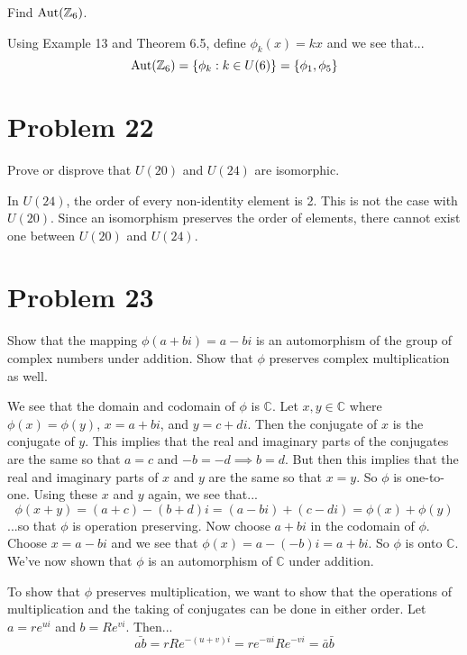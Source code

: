 \documentclass{article}
\begin{document}
Find $\mbox{Aut}(\mathbb{Z}_6)$.

Using Example 13 and Theorem 6.5, define $\phi_k(x)=kx$ and we see that...
\begin{equation*}
\mbox{Aut}(\mathbb{Z}_6) = \{\phi_k:k\in U(6)\} = \{\phi_1,\phi_5\}
\end{equation*}

\section*{Problem 22}

Prove or disprove that $U(20)$ and $U(24)$ are isomorphic.

In $U(24)$, the order of every non-identity element is 2.  This is not the
case with $U(20)$.  Since an isomorphism preserves the order of elements,
there cannot exist one between $U(20)$ and $U(24)$.

\section*{Problem 23}

Show that the mapping $\phi(a+bi)=a-bi$ is an automorphism of the group
of complex numbers under addition.  Show that $\phi$ preserves complex
multiplication as well.

We see that the domain and codomain of $\phi$ is $\mathbb{C}$.
Let $x,y\in\mathbb{C}$ where $\phi(x)=\phi(y)$, $x=a+bi$, and $y=c+di$.
Then the conjugate of $x$ is the conjugate of $y$.  This implies that
the real and imaginary parts of the conjugates are the same so that
$a=c$ and $-b=-d\implies b=d$.  But then this implies that the real and
imaginary parts of $x$ and $y$ are the same so that $x=y$.  So $\phi$ is
one-to-one.  Using these $x$ and $y$ again, we see that...
\begin{equation*}
\phi(x+y) = (a+c)-(b+d)i = (a-bi)+(c-di) = \phi(x)+\phi(y)
\end{equation*}
...so that $\phi$ is operation preserving.
Now choose $a+bi$ in the codomain of $\phi$.  Choose $x=a-bi$ and we see
that $\phi(x) = a-(-b)i = a+bi$.  So $\phi$ is onto $\mathbb{C}$.
We've now shown that $\phi$ is an automorphism of $\mathbb{C}$ under addition.

To show that $\phi$ preserves multiplication, we want to show that
the operations of multiplication and the taking of conjugates can be
done in either order.  Let $a=re^{ui}$ and $b=Re^{vi}$.  Then...
\begin{equation*}
\bar{ab} = rRe^{-(u+v)i} = re^{-ui}Re^{-vi} = \bar{a}\bar{b}
\end{equation*}
\end{document}
